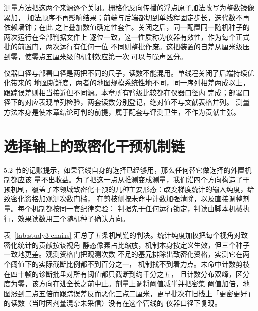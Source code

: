 测量方法把这两个来源逐个关闭。栅格化反向传播的浮点原子加法改写为整数镜像累加，
加法顺序不再影响结果；前端与后端都切到单线程固定步长，迭代数不再依赖墙钟；在此
之上叠加数值确定性套件。关闭之后，同一配置同一随机种子的两次运行在全部判据文件上
逐位一致，这一性质称为仪器有效性，作为每个正式批的前置门，两次运行有任何一位
不同则整批作废。这把装置的自差从厘米级压到零，使零点五厘米级的机制效应第一次
可以与噪声区分。

仪器口径与部署口径是两把不同的尺子，读数不能混用。单线程关闭了后端持续优化带来的
地图新鲜度，两者的地图规模系统性地不同，同一序列相差两成以上，跟踪误差则相当接近但不同源。本章所有臂级比较都在仪器口径内
完成；部署口径下的对应表现单列检验，两套读数分别登记，绝对值不与文献表格并列。
测量方法本身是使本章结论可判的前提，属于配套与评测卫生，不作为贡献主张。

\section{选择轴上的致密化干预机制链}
\label{sec:study3-selection}

5.2 节的记账提示，如果管线自身的选择已经够用，那么任何替它做选择的外置机制都应该
量不出收益。为了把这一点从推测变成测量，我们沿四个方向构造了干预机制，覆盖了本领域致密化干预的几种主要形态：改变梯度统计的输入纯度，给致密化资格加观测次数门槛，
在剪枝侧按未命中计数加强清除，以及直接调整剂量。每个机制都按同一套纪律实验：
判据先于任何运行锁定，判读由脚本机械执行，效果读数用三个随机种子确认方向。

表~\ref{tab:study3-chains} 汇总了五条机制链的判决。统计纯度加权把每个视角对致密化统计的贡献按该视角
静态像素占比缩放，机制本身按定义生效，但三个种子一致地更差。观测资格门把观测次数
不足的基元排除出致密化资格，实测它在两个阈值下的实际截断比例都不到百分之一，
机制找不到着力点。未命中计数剪枝在四十帧的诊断批里对所有阈值都只截断到约千分之五，
且计数分布双峰，区分度为零，该方向在进全长之前中止。剂量上调将阈值减半并把密集
阈值加倍，地图涨到二点五倍而跟踪误差反而恶化三点二厘米，更早批次在旧栈上「更密更好」的读数（当时因剂量混杂未采信）没有在这个管线的
仪器口径下复现。

